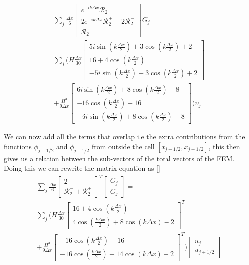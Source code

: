  \begin{multline}
 \sum_j \frac{\Delta x}{6}\begin{bmatrix} e^{-ik\Delta x} \mathcal{R}^+_2 \\2 e^{-ik\Delta x} \mathcal{R}^+_2 +2 \mathcal{R}^-_2 \\ \mathcal{R}^-_2 \end{bmatrix} G_j = \\\sum_j \Bigg(H\frac{\Delta x}{30}\begin{bmatrix} 5i\sin\left(k \frac{\Delta x}{2}\right) + 3\cos\left(k \frac{\Delta x}{2}\right) + 2\\16 + 4 \cos\left(k \frac{\Delta x}{2}\right) \\ -5i\sin\left(k \frac{\Delta x}{2}\right) + 3\cos\left(k \frac{\Delta x}{2}\right) + 2 \end{bmatrix} \\+ \frac{H^3 }{9\Delta x}\begin{bmatrix} 6i\sin\left(k \frac{\Delta x}{2}\right) + 8\cos\left(k \frac{\Delta x}{2}\right) - 8 \\ - 16\cos\left(k \frac{\Delta x}{2}\right) + 16 \\ -6i\sin\left(k \frac{\Delta x}{2}\right) + 8\cos\left(k \frac{\Delta x}{2}\right) - 8 \end{bmatrix}  \Bigg) \upsilon_j
 \end{multline}
 
 We can now add all the terms that overlap i.e the extra contributions from the functions $\phi_{j+1/2}$ and $\phi_{j-1/2}$ from outside the cell $\left[x_{j-1/2}, x_{j+1/2}\right]$, this then gives us a relation between the sub-vectors of the total vectors of the FEM. Doing this we can rewrite the matrix equation as
 []
 \begin{multline}
 \sum_j \frac{\Delta x}{6}\begin{bmatrix} 2  \\ \mathcal{R}^-_2 + \mathcal{R}^+_2 \end{bmatrix}^T \begin{bmatrix} G_j  \\ G_j\end{bmatrix}  = \\\sum_j \Bigg(H\frac{\Delta x}{30}\begin{bmatrix}16 + 4 \cos\left(k \frac{\Delta x}{2}\right) \\ 4\cos\left(\frac{k\Delta x}{2}\right) + 8 \cos\left(k \Delta x\right) - 2\end{bmatrix}^T  \\+ \frac{H^3 }{9\Delta x}\begin{bmatrix}  - 16\cos\left(k \frac{\Delta x}{2}\right) + 16 \\ -16\cos\left(\frac{k\Delta x}{2}\right) + 14 \cos\left(k \Delta x\right) + 2 \end{bmatrix}^T    \Bigg) \begin{bmatrix} u_j  \\ u_{j+1/2} \end{bmatrix}
 \end{multline}
 
